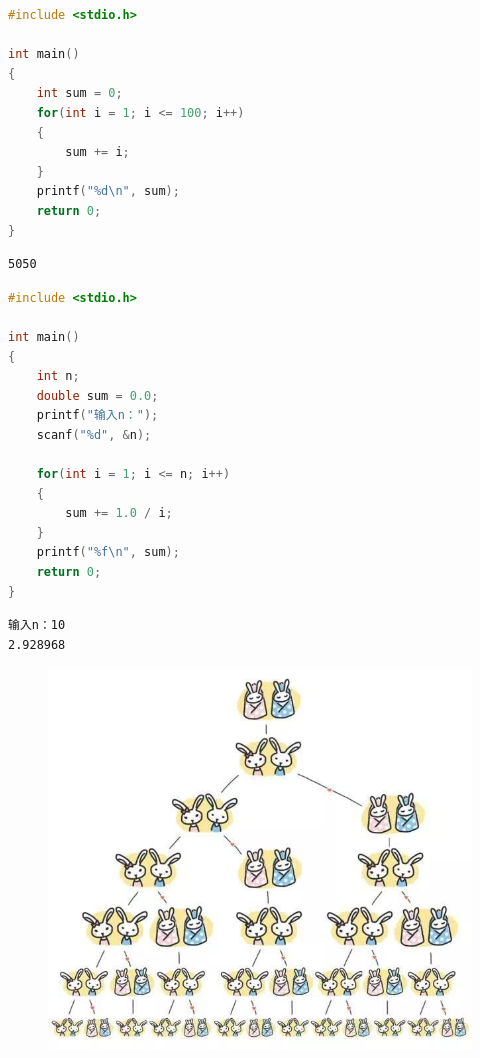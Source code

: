 \vspace{0.5cm}


\begin{lstlisting}[language=C]
#include <stdio.h>

int main()
{
    int sum = 0;
    for(int i = 1; i <= 100; i++)
    {
        sum += i;
    }
    printf("%d\n", sum);
    return 0;
}
\end{lstlisting}

\begin{tcolorbox}
	\begin{verbatim}
5050
\end{verbatim}
\end{tcolorbox}

\vspace{0.5cm}


\begin{lstlisting}[language=C]
#include <stdio.h>

int main()
{
    int n;
    double sum = 0.0;
    printf("输入n：");
    scanf("%d", &n);

    for(int i = 1; i <= n; i++)
    {
        sum += 1.0 / i;
    }
    printf("%f\n", sum);
    return 0;
}
\end{lstlisting}

\begin{tcolorbox}
	\begin{verbatim}
输入n：10
2.928968
\end{verbatim}
\end{tcolorbox}

\vspace{0.5cm}


\begin{figure}[H]
	\centering
	\includegraphics[scale=0.3]{img/C4/4-4/1.png}
\end{figure}

